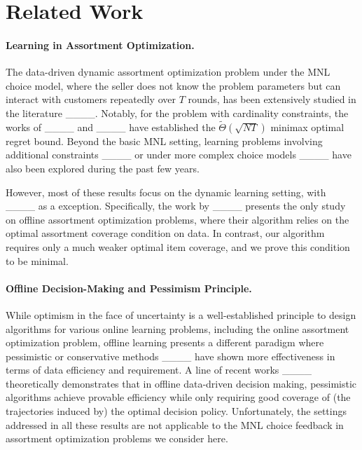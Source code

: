 \section{Related Work}
\paragraph{Learning in Assortment Optimization.} The data-driven dynamic assortment optimization problem under the MNL choice model, where the seller does not know the problem parameters but can interact with customers repeatedly over $T$ rounds, has been extensively studied in the literature ____. 
Notably, for the problem with cardinality constraints, the works of ____ and ____ have established the $\widetilde{\Theta}(\sqrt{NT})$ minimax optimal regret bound. 
Beyond the basic MNL setting, learning problems involving additional constraints ____ or under more complex choice models ____ have also been explored during the past few years.

However, most of these results focus on the dynamic learning setting, with ____ as a exception. Specifically, the work by ____ presents the only study on offline assortment optimization problems, where their algorithm relies on the optimal assortment coverage condition on data. 
In contrast, our algorithm requires only a much weaker optimal item coverage, and we prove this condition to be minimal.


\paragraph{Offline Decision-Making and Pessimism Principle.} 
While optimism in the face of uncertainty is a well-established principle to design algorithms for various online learning problems, including the online assortment optimization problem, offline learning presents a different paradigm where pessimistic or conservative methods ____ have shown more effectiveness in terms of data efficiency and requirement. 
A line of recent works ____ theoretically demonstrates that in offline data-driven decision making, pessimistic algorithms achieve provable efficiency while only requiring good coverage of (the trajectories induced by) the optimal decision policy. 
Unfortunately, the settings addressed in all these results are not applicable to the MNL choice feedback in assortment optimization problems we consider here.